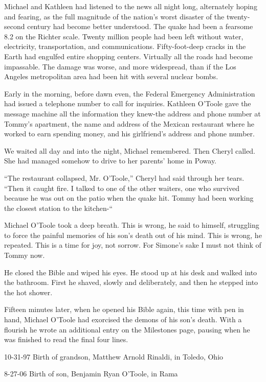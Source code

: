 \documentclass[]{article}
\begin{document}
{Michael and Kathleen had listened to the news all night long, alternately hoping and fearing, as the full magnitude of the nation’s worst disaster of the twenty-second century had become better understood.  The quake had been a fearsome 8.2 on the Richter scale.  Twenty million people had been left without water, electricity, transportation, and communications.  Fifty-foot-deep cracks in the Earth had engulfed entire shopping centers.  Virtually all the roads had become impassable.  The damage was worse, and more widespread, than if the Los Angeles metropolitan area had been hit with several nuclear bombs.

Early in the morning, before dawn even, the Federal Emergency Administration had issued a telephone number to call for inquiries.  Kathleen O’Toole gave the message machine all the information they knew-the address and phone number at Tommy’s apartment, the name and address of the Mexican restaurant where he worked to earn spending money, and his girlfriend’s address and phone number.

We waited all day and into the night, Michael remembered.  Then Cheryl called.  She had managed somehow to drive to her parents’ home in Poway.

“The restaurant collapsed, Mr.  O’Toole,” Cheryl had said through her tears.  “Then it caught fire.  I talked to one of the other waiters, one who survived because he was out on the patio when the quake hit.  Tommy had been working the closest station to the kitchen-“

Michael O’Toole took a deep breath.  This is wrong, he said to himself, struggling to force the painful memories of his son’s death out of his mind.  This is wrong, he repeated.  This is a time for joy, not sorrow.  For Simone’s sake I must not think of Tommy now.

He closed the Bible and wiped his eyes.  He stood up at his desk and walked into the bathroom.  First he shaved, slowly and deliberately, and then he stepped into the hot shower.

Fifteen minutes later, when he opened his Bible again, this time with pen in hand, Michael O’Toole had exorcised the demons of his son’s death.  With a flourish he wrote an additional entry on the Milestones page, pausing when he was finished to read the final four lines.

10-31-97 Birth of grandson, Matthew Arnold Rinaldi, in Toledo, Ohio

8-27-06 Birth of son, Benjamin Ryan O’Toole, in Rama

}
\end{document}
